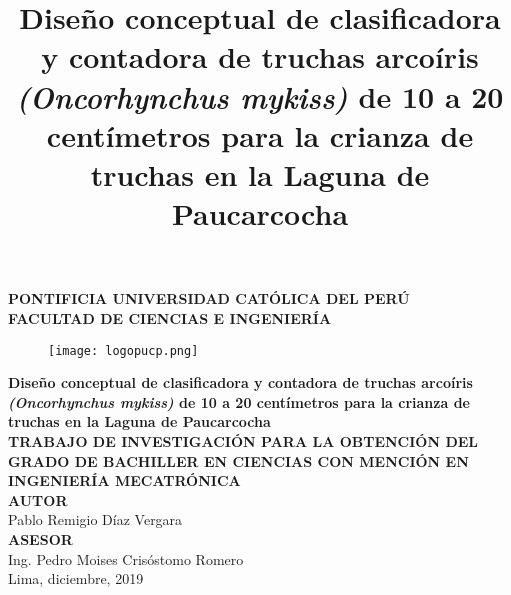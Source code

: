 \clearpage{\pagestyle{empty}\cleardoublepage}
\begin{titlepage}
\begin{center}
 {\Large \bf PONTIFICIA UNIVERSIDAD CATÓLICA DEL PERÚ}\\
  \vspace{0.8 cm} 
  {\Large \bf FACULTAD DE CIENCIAS E INGENIERÍA}\\
  \vspace{1.75 cm}
 \begin{figure}[H]
    \centering
    \texttt{[image: logopucp.png]}
\end{figure}
  \vspace{0.25cm}

\title{Diseño conceptual de clasificadora y contadora de truchas arcoíris \textit{(Oncorhynchus mykiss)} de 10 a 20 centímetros para la crianza de truchas en la Laguna de Paucarcocha} %
{\Large \bf Diseño conceptual de clasificadora y contadora de truchas arcoíris \textit{(Oncorhynchus mykiss)} de 10 a 20 centímetros para la crianza de truchas en la Laguna de Paucarcocha}\\ %
\vspace{0.5cm}
{\Large \bf TRABAJO DE INVESTIGACIÓN PARA LA OBTENCIÓN DEL GRADO DE BACHILLER EN CIENCIAS CON MENCIÓN EN INGENIERÍA MECATRÓNICA}\\[1.5 cm]
{\large \bf AUTOR}\\[0.5cm]
{\large Pablo Remigio Díaz Vergara}\\[1.25 cm] %
{\large \bf ASESOR}\\[0.5 cm] 
{\large Ing. Pedro Moises Crisóstomo Romero}\\[0.5 cm] %
\vspace{1.75 cm}
{\large Lima, diciembre, 2019}

\end{center}
\end{titlepage}